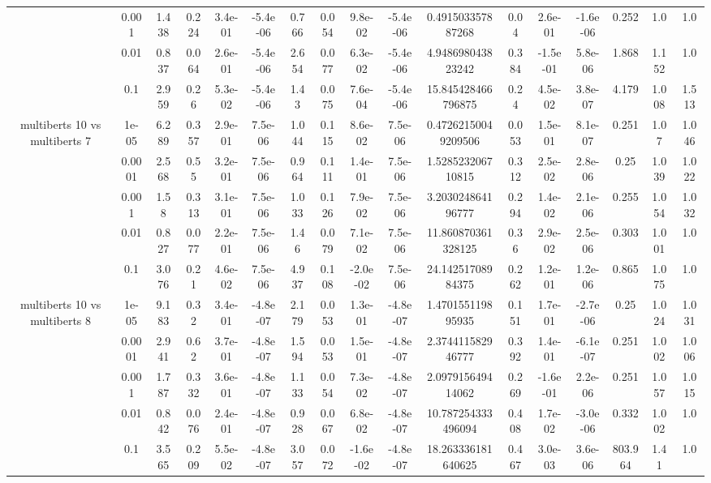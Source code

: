 \begin{tabular}{|c|c|c|c|c|c|c|c|c|c|c|c|c|c|c|c|c|}
 & 0.001 & 1.438 & 0.224 & 3.4e-01 & -5.4e-06 & 0.766 & 0.054 & 9.8e-02 & -5.4e-06 & 0.491503357887268 & 0.04 & 2.6e-01 & -1.6e-06 & 0.252 & 1.0 & 1.0 \\
 & 0.01 & 0.837 & 0.064 & 2.6e-01 & -5.4e-06 & 2.654 & 0.077 & 6.3e-02 & -5.4e-06 & 4.948698043823242 & 0.384 & -1.5e-01 & 5.8e-06 & 1.868 & 1.152 & 1.0 \\
 & 0.1 & 2.959 & 0.26 & 5.3e-02 & -5.4e-06 & 1.43 & 0.075 & 7.6e-04 & -5.4e-06 & 15.845428466796875 & 0.24 & 4.5e-02 & 3.8e-07 & 4.179 & 1.008 & 1.513 \\
\hline
\multirow{5}{*}{multiberts 10 vs multiberts 7} & 1e-05 & 6.289 & 0.357 & 2.9e-01 & 7.5e-06 & 1.044 & 0.115 & 8.6e-02 & 7.5e-06 & 0.47262150049209506 & 0.053 & 1.5e-01 & 8.1e-07 & 0.251 & 1.07 & 1.046 \\
 & 0.0001 & 2.568 & 0.55 & 3.2e-01 & 7.5e-06 & 0.964 & 0.111 & 1.4e-01 & 7.5e-06 & 1.528523206710815 & 0.312 & 2.5e-02 & 2.8e-06 & 0.25 & 1.039 & 1.022 \\
 & 0.001 & 1.58 & 0.313 & 3.1e-01 & 7.5e-06 & 1.033 & 0.126 & 7.9e-02 & 7.5e-06 & 3.203024864196777 & 0.294 & 1.4e-02 & 2.1e-06 & 0.255 & 1.054 & 1.032 \\
 & 0.01 & 0.827 & 0.077 & 2.2e-01 & 7.5e-06 & 1.46 & 0.079 & 7.1e-02 & 7.5e-06 & 11.860870361328125 & 0.36 & 2.9e-02 & 2.5e-06 & 0.303 & 1.001 & 1.0 \\
 & 0.1 & 3.076 & 0.21 & 4.6e-02 & 7.5e-06 & 4.937 & 0.108 & -2.0e-02 & 7.5e-06 & 24.14251708984375 & 0.262 & 1.2e-01 & 1.2e-06 & 0.865 & 1.075 & 1.0 \\
\hline
\multirow{5}{*}{multiberts 10 vs multiberts 8} & 1e-05 & 9.183 & 0.32 & 3.4e-01 & -4.8e-07 & 2.179 & 0.053 & 1.3e-01 & -4.8e-07 & 1.470155119895935 & 0.151 & 1.7e-01 & -2.7e-06 & 0.25 & 1.024 & 1.031 \\
 & 0.0001 & 2.941 & 0.62 & 3.7e-01 & -4.8e-07 & 1.594 & 0.053 & 1.5e-01 & -4.8e-07 & 2.374411582946777 & 0.392 & 1.4e-01 & -6.1e-07 & 0.251 & 1.002 & 1.006 \\
 & 0.001 & 1.787 & 0.332 & 3.6e-01 & -4.8e-07 & 1.133 & 0.054 & 7.3e-02 & -4.8e-07 & 2.097915649414062 & 0.269 & -1.6e-01 & 2.2e-06 & 0.251 & 1.057 & 1.015 \\
 & 0.01 & 0.842 & 0.076 & 2.4e-01 & -4.8e-07 & 0.928 & 0.067 & 6.8e-02 & -4.8e-07 & 10.787254333496094 & 0.408 & 1.7e-02 & -3.0e-06 & 0.332 & 1.002 & 1.0 \\
 & 0.1 & 3.565 & 0.209 & 5.5e-02 & -4.8e-07 & 3.057 & 0.072 & -1.6e-02 & -4.8e-07 & 18.263336181640625 & 0.467 & 3.0e-03 & 3.6e-06 & 803.964 & 1.41 & 1.0 \\

\end{tabular}
